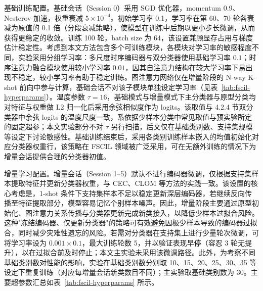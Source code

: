 基础训练配置。基础会话（Session 0）采用 SGD 优化器，momentum 0.9、Nesterov 加速，权重衰减 $5 \times 10^{-4}$。初始学习率 0.1，学习率在第 60、70 轮各衰减为原值的 0.1 倍（分段衰减策略），使模型在训练中后期以更小步长微调，从而获得更稳定的收敛。训练 100 轮，batch size 为 64，该设置兼顾显存占用与梯度估计稳定性。考虑到本文方法包含多个可训练模块，各模块对学习率的敏感程度不同，实验采用分组学习率：多尺度时序编码器与双分类器使用基础学习率 $0.1$；时序注意力融合模块使用较小学习率 $0.01$，因其自注意力结构在较大学习率下易出现不稳定，较小学习率有助于稳定训练。图注意力网络仅在增量阶段的 N-way K-shot 前向中参与计算，基础会话不对该子模块单独设定学习率（见表~\ref{tab:fscil-hyperparams}）。温度参数 $\tau=16$，基础模式与增量模式下主分类器与原型分类均对特征与权重做 L2 归一化后采用余弦相似度作为 logits。该取值与 4.2.4 节双分类器中余弦 logits 的温度尺度一致，系依据少样本分类中常见取值与预实验所定的固定超参；本文实验部分不对 $\tau$ 另行扫描，后文仅在基础类别数、支持集规模等设定下讨论敏感性。基础训练结束后，采用各类别训练样本嵌入的均值初始化对应分类器权重行，该策略在 FSCIL 领域被广泛采用，可在无额外训练的情况下为增量会话提供合理的分类器初值。

增量学习配置。增量会话（Session 1–5）默认不进行编码器微调，仅根据支持集样本提取特征并更新分类器权重，与 CEC、CLOM 等方法的实践一致。该设置的核心考虑是，1-shot 条件下支持集样本不足以稳定更新深层编码器，若继续反向传播至特征提取部分，模型容易记忆个别样本噪声。因此，增量阶段主要通过原型初始化、图注意力关系传播与分类器更新完成新类接入，以降低少样本过拟合风险。这种"冻结编码器、仅更新分类器"的策略可有效避免因极少样本导致的编码器过拟合，同时减少灾难性遗忘的风险。若需对分类器在支持集上进行少量轮次微调，可将学习率设为 $0.001 \times 0.1$，最大训练轮数 5，并以验证表现早停（容忍 3 轮无提升），以在过拟合前及时停止；本文主实验未采用该微调路径。此外，为考察不同基础类别数对性能的影响，实验在基础类别数分别取 10、15、20、25、30、35 等设定下重复训练（对应每增量会话新类数目不同）；主实验取基础类别数为 30。主要超参数汇总如表~\ref{tab:fscil-hyperparams} 所示。


